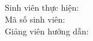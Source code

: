 \begin{titlepage}
\begin{center}
{\large \institution}\\
{\large \faculty}\\[2cm]

{\large \reporttype}\\[1cm]

{\Large \bfseries \reporttitle}\\[3cm]

\begin{flushleft}
Sinh viên thực hiện: \studentname\\
Mã số sinh viên: \studentid\\
Giảng viên hướng dẫn: \advisorname
\end{flushleft}

\vfill
{\large \academicyear}
\end{center}
\end{titlepage}
